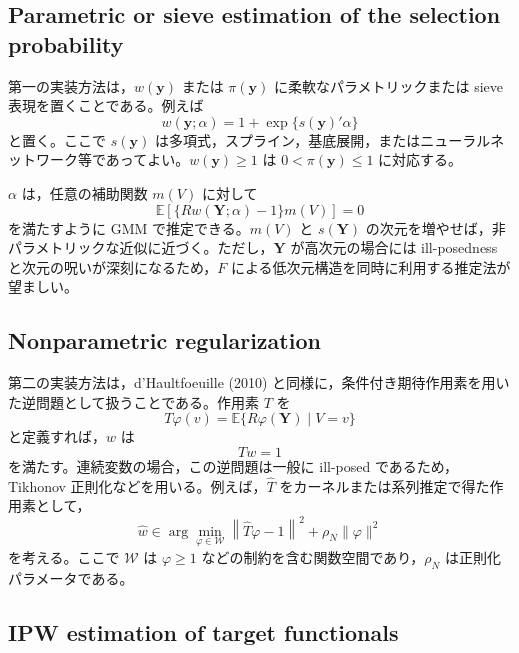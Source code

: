\documentclass[10pt,a4paper]{article}
\newcommand{\E}{\mathbb{E}}
\newcommand{\1}{\mathbf{1}}
\newcommand{\Y}{\bm{Y}}
\begin{document}
\subsection{Parametric or sieve estimation of the selection probability}

第一の実装方法は，$w(\bm y)$ または $\pi(\bm y)$ に柔軟なパラメトリックまたは sieve 表現を置くことである。例えば
\begin{equation}
  w(\bm y;\alpha)=1+\exp\{s(\bm y)'\alpha\}
  \label{eq:sieve-weight}
\end{equation}
と置く。ここで $s(\bm y)$ は多項式，スプライン，基底展開，またはニューラルネットワーク等であってよい。$w(\bm y)\geq 1$ は $0<\pi(\bm y)\leq 1$ に対応する。

$\alpha$ は，任意の補助関数 $m(V)$ に対して
\begin{equation}
  \E\left[\{Rw(\Y;\alpha)-1\}m(V)\right]=0
  \label{eq:gmm-weight}
\end{equation}
を満たすように GMM で推定できる。$m(V)$ と $s(\Y)$ の次元を増やせば，非パラメトリックな近似に近づく。ただし，$\Y$ が高次元の場合には ill-posedness と次元の呪いが深刻になるため，$F$ による低次元構造を同時に利用する推定法が望ましい。

\subsection{Nonparametric regularization}

第二の実装方法は，d'Haultfoeuille (2010) と同様に，条件付き期待作用素を用いた逆問題として扱うことである。作用素 $T$ を
\begin{equation}
  T\varphi(v)=\E\{R\varphi(\Y)\mid V=v\}
\end{equation}
と定義すれば，$w$ は
\begin{equation}
  Tw=1
  \label{eq:operator-equation}
\end{equation}
を満たす。連続変数の場合，この逆問題は一般に ill-posed であるため，Tikhonov 正則化などを用いる。例えば，$\widehat T$ をカーネルまたは系列推定で得た作用素として，
\begin{equation}
  \widehat w\in
  \arg\min_{\varphi\in\mathcal W}
  \left\|\widehat T\varphi-1\right\|^2+\rho_N\|\varphi\|^2
  \label{eq:tikhonov-vector}
\end{equation}
を考える。ここで $\mathcal W$ は $\varphi\geq 1$ などの制約を含む関数空間であり，$\rho_N$ は正則化パラメータである。

\subsection{IPW estimation of target functionals}
\end{document}
